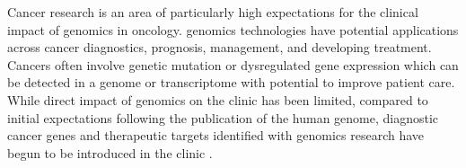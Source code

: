 Cancer research is an area of particularly high expectations for the clinical impact of \gls{genomics} in oncology. \Gls{genomics} technologies have potential applications across cancer diagnostics, prognosis, management, and developing treatment. Cancers often involve genetic mutation or dysregulated gene expression which can be detected in a genome or transcriptome with potential to improve patient care. While direct impact of \gls{genomics} on the clinic has been limited, compared to initial expectations following the publication of the human genome, diagnostic cancer genes and therapeutic targets identified with \gls{genomics} research have begun to be introduced in the clinic \citep{Stratton2009}.



